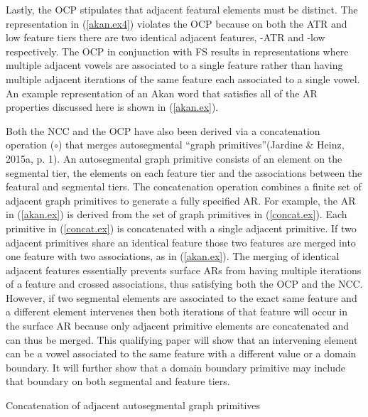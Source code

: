 \documentclass[,doc,floatsintext]{apa6}
\theoremstyle{definition}
\theoremstyle{definition}
\theoremstyle{definition}
\theoremstyle{remark}
\begin{document}
Lastly, the OCP stipulates that adjacent featural elements must be
distinct. The representation in (\ref{akan.ex4}) violates the OCP
because on both the ATR and low feature tiers there are two identical
adjacent features, -ATR and -low respectively. The OCP in conjunction
with FS results in representations where multiple adjacent vowels are
associated to a single feature rather than having multiple adjacent
iterations of the same feature each associated to a single vowel. An
example representation of an Akan word that satisfies all of the AR
properties discussed here is shown in (\ref{akan.ex}).

Both the NCC and the OCP have also been derived via a concatenation
operation (\(\circ\)) that merges autosegmental \enquote{graph
primitives}(Jardine \& Heinz, 2015a, p. 1). An autosegmental graph
primitive consists of an element on the segmental tier, the elements on
each feature tier and the associations between the featural and
segmental tiers. The concatenation operation combines a finite set of
adjacent graph primitives to generate a fully specified AR. For example,
the AR in (\ref{akan.ex}) is derived from the set of graph primitives in
(\ref{concat.ex}). Each primitive in (\ref{concat.ex}) is concatenated
with a single adjacent primitive. If two adjacent primitives share an
identical feature those two features are merged into one feature with
two associations, as in (\ref{akan.ex}). The merging of identical
adjacent features essentially prevents surface ARs from having multiple
iterations of a feature and crossed associations, thus satisfying both
the OCP and the NCC. However, if two segmental elements are associated
to the exact same feature and a different element intervenes then both
iterations of that feature will occur in the surface AR because only
adjacent primitive elements are concatenated and can thus be merged.
This qualifying paper will show that an intervening element can be a
vowel associated to the same feature with a different value or a domain
boundary. It will further show that a domain boundary primitive may
include that boundary on both segmental and feature tiers.

\begin{exe}
\ex \label{concat.ex} Concatenation of adjacent autosegmental graph primitives \\
\end{exe}
\end{document}
